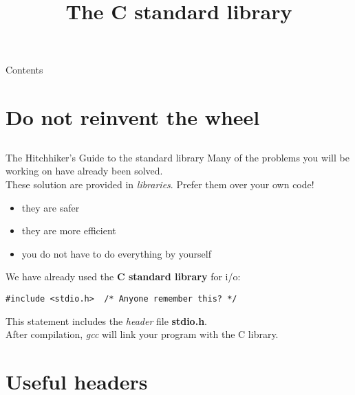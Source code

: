 
\newcommand{\topic}{
	The C standard library
}

\title{\topic}
\supertitle{\course}
\date{}



\maketitle

\begin{frame}{Contents}
	\tableofcontents
\end{frame}

\section{Do not reinvent the wheel}
\subsection{}

\begin{frame}[fragile]{The Hitchhiker's Guide to the standard library}
	Many of the problems you will be working on have already been solved.\\
	\bigskip
	These solution are provided in \textit{libraries}. Prefer them over your own code!\\
	\begin{itemize}
		\item they are safer
		\item they are more efficient
		\item you do not have to do everything by yourself
	\end{itemize}
	\bigskip
	We have already used the \textbf{C standard library} for i/o:
\begin{lstlisting}[numbers=none]
#include <stdio.h>	/* Anyone remember this? */
\end{lstlisting}
	This statement includes the \textit{header} file \textbf{stdio.h}.\\
	After compilation, \textit{gcc} will link your program with the C library.\\
\end{frame}
\section{Useful headers}

